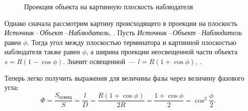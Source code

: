 \begin{wrapfigure}[8]{r}{.3\tw}
    \centering
    \vspace{-1pc}
    \caption{Проекция объекта на картинную плоскость наблюдателя}
    \label{pic:phase-angle-2}
\end{wrapfigure}
Однако сначала рассмотрим картину происходящего в проекции на плоскость {\slshape Источник\,--\,Объект\,--\,Наблюдатель}, . Пусть  {\slshape Источник\,--\,Объект\,--\,Наблюдатель} равен $\phi$. Тогда угол между плоскостью терминатора и картинной плоскостью наблюдателя также равен $\phi$, а ширина проекции неосвещенной части объекта $s = R(1 - \cos \phi)$. Значит освещенной~--- $l = R( 1+ \cos \phi)$, .

Теперь легко получить выражения для величины фазы через величину фазового угла:
\begin{equation}
    \Phi = \frac{S_\text{освещ}}{S} = \frac{l}{D} = \frac{R ( 1 + \cos \phi )}{2R} = \frac{1 + \cos \phi}{2} =  \cos^2 \frac{\phi}{2}.
\end{equation}

